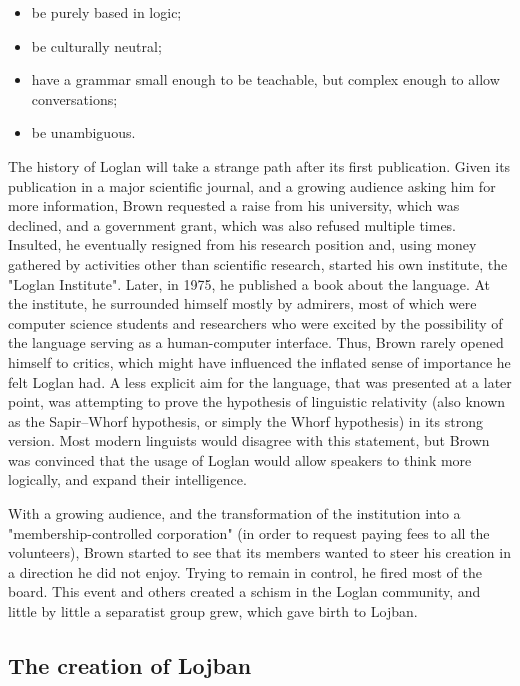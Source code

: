 \begin{itemize}
    \setlength\itemsep{-0.5em}
    \item be purely based in logic;
    \item be culturally neutral;
    \item have a grammar small enough to be teachable, but complex enough to allow conversations;
    \item be unambiguous.
 \end{itemize}

The history of Loglan will take a strange path after its first publication. Given its publication in a major scientific journal, and a growing audience
asking him for more information, Brown requested a raise from his university, which was declined, and a government grant, which was also refused multiple times.
Insulted, he eventually resigned from his research position and, using money gathered by activities other than scientific research, started his own institute,
the "Loglan Institute". Later, in 1975, he published a book about the language. At the institute, he surrounded himself mostly by admirers, most of which were computer science
students and researchers who were excited by the possibility of the language serving as a human-computer interface. Thus, Brown rarely opened himself to critics,
which might have influenced the inflated sense of importance he felt Loglan had. A less explicit aim for the language, that was presented at a later point, was attempting
to prove the hypothesis of linguistic relativity (also known as the Sapir–Whorf hypothesis, or simply the Whorf hypothesis) in its strong version.
Most modern linguists would disagree with this statement, but Brown was convinced that the usage of Loglan would allow speakers to think more logically, and expand their
intelligence.\newline

With a growing audience, and the transformation of the institution into a "membership-controlled corporation" (in order to request paying fees to all the volunteers),
Brown started to see that its members wanted to steer his creation in a direction he did not enjoy. Trying to remain in control, he fired most of the board.
This event and others created a schism in the Loglan community, and little by little a separatist group grew, which gave birth to Lojban.

\subsection{The creation of Lojban}

